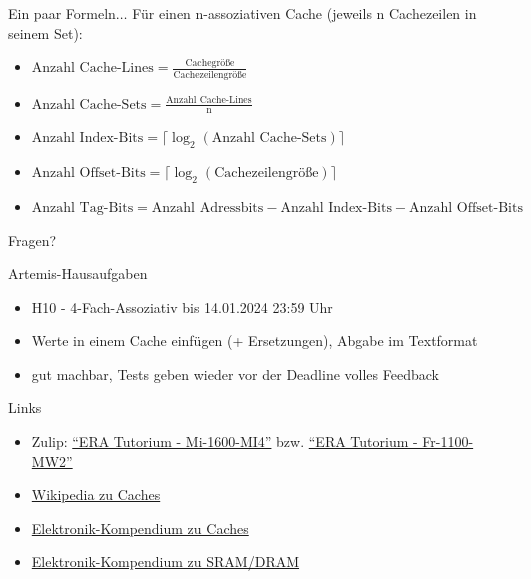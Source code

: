 \documentclass[
  german,            %
  aspectratio=169,    %
]{tumbeamer}
\begin{document}
\begin{frame}[c, fragile]{Ein paar Formeln$\ldots$}
  Für einen n-assoziativen Cache (jeweils n Cachezeilen in seinem Set):
  \vspace{0.25cm}
  \begin{itemize}
    \item $\textrm{Anzahl Cache-Lines}=\frac{\textrm{Cachegröße}}{\textrm{Cachezeilengröße}}$
    \item $\textrm{Anzahl Cache-Sets}=\frac{\textrm{Anzahl Cache-Lines}}{\textrm{n}}$
    \item $\textrm{Anzahl Index-Bits}=\lceil\log_2(\textrm{Anzahl Cache-Sets})\rceil$
    \item $\textrm{Anzahl Offset-Bits}=\lceil\log_2(\textrm{Cachezeilengröße})\rceil$
    \item $\textrm{Anzahl Tag-Bits}= \textrm{Anzahl Adressbits} - \textrm{Anzahl Index-Bits} - \textrm{Anzahl Offset-Bits}$
  \end{itemize}
\end{frame}


\begin{frame}[c]{}{}
  \begin{center}
    \LARGE Fragen?
  \end{center}
\end{frame}

\begin{frame}[c, fragile]{Artemis-Hausaufgaben}{}
  \begin{itemize}
    \item H10 - 4-Fach-Assoziativ bis 14.01.2024 23:59 Uhr
    \item Werte in einem Cache einfügen (+ Ersetzungen), Abgabe im Textformat
    \item gut machbar, Tests geben wieder vor der Deadline volles Feedback
  \end{itemize}
\end{frame}

\begin{frame}[fragile, c]{Links}{}
  \begin{itemize}
    \item Zulip: \href{https://zulip.in.tum.de/#narrow/stream/1917-ERA-Tutorium---Mi-1600-MI4}{\enquote{ERA Tutorium - Mi-1600-MI4}}
    bzw. \href{https://zulip.in.tum.de/#narrow/stream/1940-ERA-Tutorium---Fr-1100-MW2}{\enquote{ERA Tutorium - Fr-1100-MW2}}
    \item \href{https://en.wikipedia.org/wiki/Cache_placement_policies}{Wikipedia zu Caches}
    \item \href{https://www.elektronik-kompendium.de/sites/com/0309291.htm}{Elektronik-Kompendium zu Caches}
    \item \href{https://www.elektronik-kompendium.de/sites/com/0309191.htm}{Elektronik-Kompendium zu SRAM/DRAM}
  \end{itemize}
\end{frame}

\maketitle
\end{document}

